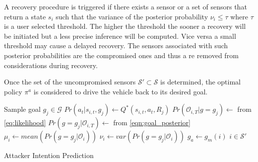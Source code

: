 \documentclass[letterpaper, 10 pt, conference]{ieeeconf}  %
\begin{document}
A recovery procedure is triggered if there exists a sensor or a set of sensors that return a state $s_i$ such that the variance of the posterior probability $\nu_i \leq \tau$ where $\tau$ is a user selected threshold. The higher the threshold the sooner a recovery will be initiated but a less precise inference will be computed. Vice versa a small threshold may cause a delayed recovery. The sensors associated with such posterior probabilities are the compromised ones and thus a re removed from considerations during recovery.


Once the set of the uncompromised sensors $\mathcal S' \subset \mathcal S$ is determined, the optimal policy $\pi^a$ is considered to drive the vehicle back to its desired goal.

\begin{algorithm}\label{alg:alg1}
    {
        {
            Sample goal $g_j \in \mathcal{G}$\;
            { 
                $Pr(a_t|s_{i,t},g_j) \leftarrow Q^*(s_{i,t},a_t,R_j)$\;
            }
            $Pr(\mathcal{O}_{i,T}|g=g_j) \leftarrow$  from \ref{eq:likelihood}\;
            $Pr(g=g_j|\mathcal{O}_{i,T}) \leftarrow$ from \ref{eqn:goal_posterior}\;
        }
        $\mu_i \leftarrow mean(Pr(g=g_j|\mathcal{O}_i))$\;
        $\nu_i \leftarrow  var(Pr(g=g_j|\mathcal{O}_i))$\;
        {
            $g_a \leftarrow g_m(i)$\;
            $i \in \mathcal{S}'$\;
        }
    }
    \caption{Attacker Intention Prediction}
\end{algorithm}
\end{document}
